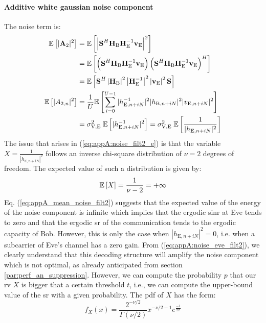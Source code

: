 \paragraph*{Additive white gaussian noise component}
The noise term is:
\begin{subequations}
    \begin{align}
        \mathbb{E} \left[|\textbf{A}_{2}|^2\right] &=  \mathbb{E} \left[\left|\textbf{S}^H \textbf{H}_{\text{B}} \textbf{H}_{\text{E}}^{-1} \textbf{v}_{\text{E}}\right|^2\right] \\
        &= \mathbb{E} \left[\left(\textbf{S}^H \textbf{H}_{\text{B}} \textbf{H}_{\text{E}}^{-1} \textbf{v}_{\text{E}} \right)\left(\textbf{S}^H \textbf{H}_{\text{B}} \textbf{H}_{\text{E}}^{-1} \textbf{v}_{\text{E}} \right)^H\right] \\
        &=\mathbb{E} \left[\textbf{S}^H   \left|\textbf{H}_{\text{B}}\right|^2 \left|\textbf{H}_{\text{E}}^{-1}\right|^2 \left|\textbf{v}_{\text{E}}\right|^2 \textbf{S} \right] \\
        \mathbb{E} \left[|A_{2,n}|^2\right] &= \frac{1}{U} \mathbb{E} \left[\sum_{i=0}^{U-1} |h_{\text{E}, n + iN}^{-1}|^2 |h_{\text{B}, n + iN}|^2 |v_{\text{E}, n + iN}|^2\right] \\
        &= \sigma^2_{\text{V,E}}\;\mathbb{E} \left[|h_{\text{E}, n + iN}^{-1}|^2\right] =  \sigma^2_{\text{V,E}} \;\mathbb{E} \left[ \frac{1}{|h_{\text{E}, n + iN}|^2}\right] \label{eq:appA:noise_filt2_e}
    \end{align}
    \label{eq:appA:noise_eve_filt2}
\end{subequations}
The issue that arises in (\ref{eq:appA:noise_filt2_e}) is that the variable $X = \frac{1}{|h_{\text{E}, n + iN}|^2}$ follows an inverse chi-square distribution of $\nu=2$ degrees of freedom. The expected value of such a distribution is given by:
\begin{equation}
    \mathbb{E} \left[X\right] = \frac{1}{\nu - 2} = + \infty
    \label{eq:appA_mean_noise_filt2}
\end{equation}
Eq. (\ref{eq:appA_mean_noise_filt2}) suggests that the expected value of the energy of the noise component is infinite which implies that the ergodic \gls{sinr} at Eve tends to zero and that the ergodic \gls{sr} of the communication tends to the ergodic capacity of Bob. However, this is only the case when $|h_{\text{E}, n + iN}|^2 = 0$, i.e. when a subcarrier of Eve's channel has a zero gain. From (\ref{eq:appA:noise_eve_filt2}), we clearly understand that this decoding structure will amplify the noise component which is not optimal, as already anticipated from section \ref{par:perf_an_suppression}. However, we can compute the probability $p$ that our \gls{rv} $X$ is bigger that a certain threshold $t$, i.e., we can compute the upper-bound value of the \gls{sr} with a given probability. The \gls{pdf} of $X$ has the form:
\begin{equation}
    f_X(x) = \frac{2^{-\nu/2}}{\Gamma (\nu/2)} x^{-\nu/2-1} e^{\frac{-1}{2x}}
\end{equation}
